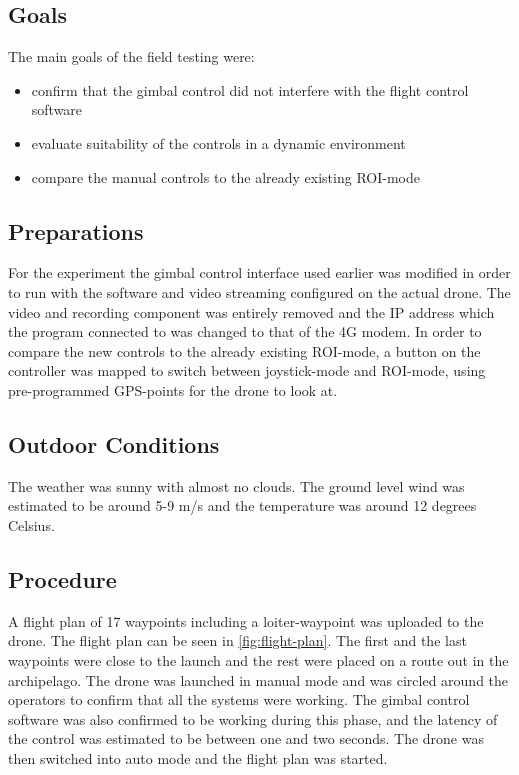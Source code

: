 \documentclass[nofilelist]{cslthse-msc}
\begin{document}
\subsection{Goals}
The main goals of the field testing were:
\begin{itemize}
   \item confirm that the gimbal control did not interfere with the flight control software
   \item evaluate suitability of the controls in a dynamic environment
   \item compare the manual controls to the already existing ROI-mode
\end{itemize} 

\subsection{Preparations}
For the experiment the gimbal control interface used earlier was modified in order to run with the software and video streaming configured on the actual drone. The video and recording component was entirely removed and the IP address which the program connected to was changed to that of the 4G modem. 
In order to compare the new controls to the already existing ROI-mode, a button on the controller was mapped to switch between joystick-mode and ROI-mode, using pre-programmed GPS-points for the drone to look at.

\subsection{Outdoor Conditions}
The weather was sunny with almost no clouds. The ground level wind was estimated to be around 5-9 m/s and the temperature was around 12 degrees Celsius.

\subsection{Procedure}
A flight plan of 17 waypoints including a loiter-waypoint was uploaded to the drone. The flight plan can be seen in \ref{fig:flight-plan}. The first and the last waypoints were close to the launch and the rest were placed on a route out in the archipelago. The drone was launched in manual mode and was circled around the operators to confirm that all the systems were working. The gimbal control software was also confirmed to be working during this phase, and the latency of the control was estimated to be between one and two seconds. The drone was then switched into auto mode and the flight plan was started.
\end{document}
